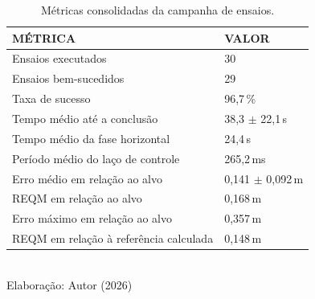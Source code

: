 \begin{table}[H]
	\centering
	\caption{Métricas consolidadas da campanha de ensaios.}
	\label{tab:metricas}

	\renewcommand{\arraystretch}{1.2}
	\normalsize

	\begin{tabular}{|p{8.4cm}|p{5.0cm}|}
		\hline
		\centering\arraybackslash\textbf{MÉTRICA} &
		\centering\arraybackslash\textbf{VALOR} \\ \hline

		Ensaios executados & 30 \\ \hline
		Ensaios bem-sucedidos & 29 \\ \hline
		Taxa de sucesso & 96{,}7\,\% \\ \hline
		Tempo médio até a conclusão & 38{,}3 $\pm$ 22{,}1\,s \\ \hline
		Tempo médio da fase horizontal & 24{,}4\,s \\ \hline
		Período médio do laço de controle & 265{,}2\,ms \\ \hline
		Erro médio em relação ao alvo & 0{,}141 $\pm$ 0{,}092\,m \\ \hline
		REQM em relação ao alvo & 0{,}168\,m \\ \hline
		Erro máximo em relação ao alvo & 0{,}357\,m \\ \hline
		REQM em relação à referência calculada & 0{,}148\,m \\ \hline

	\end{tabular}
	\\
	\vspace{0.3cm}
	\footnotesize{Elaboração: Autor (2026)}
\end{table}
